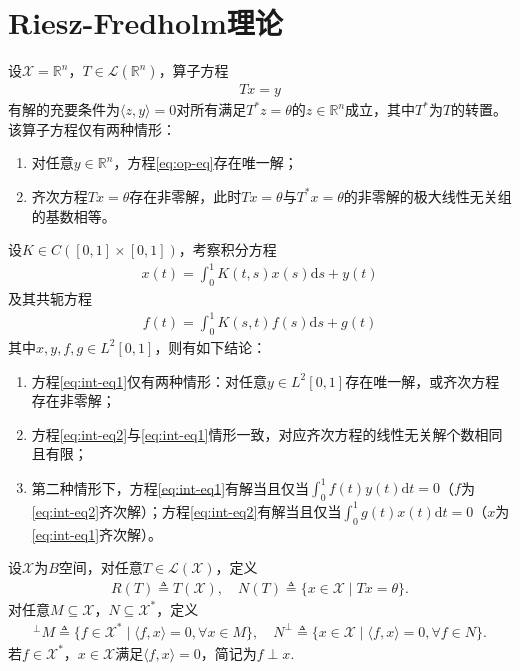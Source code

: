 \documentclass[../../main.tex]{subfiles}%
\begin{document}
\section{Riesz-Fredholm理论}

\begin{examples}
设$\mathscr{X}=\mathbb{R}^n$，$T\in\mathscr{L}(\mathbb{R}^n)$，算子方程
\begin{align}
Tx=y \label{eq:op-eq}
\end{align}
有解的充要条件为$\langle z,y\rangle=0$对所有满足$T^*z=\theta$的$z\in\mathbb{R}^n$成立，其中$T^*$为$T$的转置。
该算子方程仅有两种情形：
\begin{enumerate}[(1)]
\item 对任意$y\in\mathbb{R}^n$，方程\eqref{eq:op-eq}存在唯一解；
\item 齐次方程$Tx=\theta$存在非零解，此时$Tx=\theta$与$T^*x=\theta$的非零解的极大线性无关组的基数相等。
\end{enumerate}
\end{examples}

\begin{examples}
设$K\in C([0,1]\times[0,1])$，考察积分方程
\begin{align}
x(t)=\int_{0}^{1}K(t,s)x(s)\mathrm{d}s+y(t) \label{eq:int-eq1}
\end{align}
及其共轭方程
\begin{align}
f(t)=\int_{0}^{1}K(s,t)f(s)\mathrm{d}s+g(t) \label{eq:int-eq2}
\end{align}
其中$x,y,f,g\in L^2[0,1]$，则有如下结论：
\begin{enumerate}[(1)]
\item 方程\eqref{eq:int-eq1}仅有两种情形：对任意$y\in L^2[0,1]$存在唯一解，或齐次方程存在非零解；
\item 方程\eqref{eq:int-eq2}与\eqref{eq:int-eq1}情形一致，对应齐次方程的线性无关解个数相同且有限；
\item 第二种情形下，方程\eqref{eq:int-eq1}有解当且仅当$\int_{0}^{1}f(t)y(t)\mathrm{d}t=0$（$f$为\eqref{eq:int-eq2}齐次解）；方程\eqref{eq:int-eq2}有解当且仅当$\int_{0}^{1}g(t)x(t)\mathrm{d}t=0$（$x$为\eqref{eq:int-eq1}齐次解）。
\end{enumerate}
\end{examples}

\begin{definition}
设$\mathscr{X}$为$B$空间，对任意$T\in\mathscr{L}(\mathscr{X})$，定义
\begin{align*}
R(T)\triangleq T(\mathscr{X}),\quad N(T)\triangleq\{x\in\mathscr{X}\mid Tx=\theta\}.
\end{align*}
对任意$M\subseteq\mathscr{X}$，$N\subseteq\mathscr{X}^*$，定义
\begin{align*}
^\perp M\triangleq\{f\in\mathscr{X}^*\mid\langle f,x\rangle=0,\forall x\in M\},\quad N^\perp\triangleq\{x\in\mathscr{X}\mid\langle f,x\rangle=0,\forall f\in N\}.
\end{align*}
若$f\in\mathscr{X}^*$，$x\in\mathscr{X}$满足$\langle f,x\rangle=0$，简记为$f\perp x$.
\end{definition}
\end{document}
